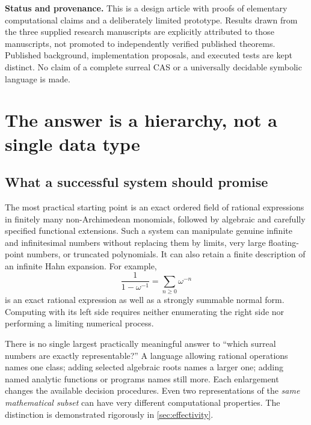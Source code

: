 \documentclass[11pt,letterpaper]{article}
\theoremstyle{definition}\newtheorem{definition}[theorem]{Definition}
\theoremstyle{remark}\newtheorem{remark}[theorem]{Remark}
\newcommand{\Q}{\mathbb Q}\newcommand{\N}{\mathbb N}\newcommand{\Z}{\mathbb Z}
\numberwithin{equation}{section}\setcounter{tocdepth}{2}
\begin{document}
\begin{titlepage}
\begin{minipage}{0.94\textwidth}
\begin{abstract}
An accompanying Wolfram Language package implements the rational-monomial core over $\Q(i)$ with lexicographic integer-vector valuations. The package and finite illustrative calculations are tested separately from the unimplemented general analytic and transseries layers.
\end{abstract}
\end{minipage}
\vfill
\begin{minipage}{0.94\textwidth}\small
\textbf{Status and provenance.} This is a design article with proofs of elementary computational claims and a deliberately limited prototype. Results drawn from the three supplied research manuscripts are explicitly attributed to those manuscripts, not promoted to independently verified published theorems. Published background, implementation proposals, and executed tests are kept distinct. No claim of a complete surreal CAS or a universally decidable symbolic language is made.
\end{minipage}
\end{titlepage}
\begingroup\small\setlength{\parskip}{0pt}\tableofcontents\endgroup\newpage

\section{The answer is a hierarchy, not a single data type}\label{sec:intro}
\subsection{What a successful system should promise}
The most practical starting point is an exact ordered field of rational expressions in finitely many non-Archimedean monomials, followed by algebraic and carefully specified functional extensions. Such a system can manipulate genuine infinite and infinitesimal numbers without replacing them by limits, very large floating-point numbers, or truncated polynomials. It can also retain a finite description of an infinite Hahn expansion. For example,
\begin{equation}\label{eq:firstexample}
 \frac{1}{1-\omega^{-1}}
 =\sum_{n\ge0}\omega^{-n}
\end{equation}
is an exact rational expression as well as a strongly summable normal form. Computing with its left side requires neither enumerating the right side nor performing a limiting numerical process.

There is no single largest practically meaningful answer to ``which surreal numbers are exactly representable?'' A language allowing rational operations names one class; adding selected algebraic roots names a larger one; adding named analytic functions or programs names still more. Each enlargement changes the available decision procedures. Even two representations of the \emph{same mathematical subset} can have very different computational properties. The distinction is demonstrated rigorously in \cref{sec:effectivity}.
\end{document}
